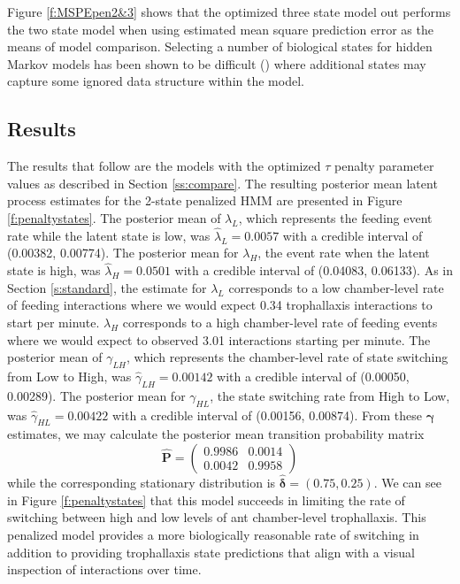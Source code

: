 \documentclass[cmbright,fleqn,referee]{envauth}
\begin{document}
Figure \ref{f:MSPEpen2&3} shows that the optimized three state model out performs the two state model when using estimated mean square prediction error as the means of model comparison. Selecting a number of biological states for hidden Markov models has been shown to be difficult (\cite{Pohle2017}) where additional states may capture some ignored data structure within the model. 
\subsection{Results}
The results that follow are the models with the optimized $\tau$ penalty parameter values as described in Section \ref{ss:compare}. The resulting posterior mean latent process estimates for the 2-state penalized HMM are presented in Figure \ref{f:penaltystates}. The posterior mean of $\lambda_L$, which represents the feeding event rate while the latent state is low, was $\hat{\lambda}_L = 0.0057$ with a credible interval of (0.00382, 0.00774). The posterior mean for $\lambda_H$, the event rate when the latent state is high, was $\hat{\lambda}_H = 0.0501$ with a credible interval of (0.04083, 0.06133). As in Section \ref{s:standard}, the estimate for $\lambda_L$ corresponds to a low chamber-level rate of feeding interactions where we would expect 0.34 trophallaxis interactions to start per minute. $\lambda_H$ corresponds to a high chamber-level rate of feeding events where we would expect to observed 3.01 interactions starting per minute. The posterior mean of $\gamma_{LH}$, which represents the chamber-level rate of state switching from Low to High, was $\hat{\gamma}_{LH} = 0.00142$  with a credible interval of (0.00050, 0.00289). The posterior mean for $\gamma_{HL}$, the state switching rate from High to Low, was $\hat{\gamma}_{HL} =  
0.00422 $ with a credible interval of (0.00156, 0.00874). From these $\bm{\gamma}$ estimates, we may calculate the posterior mean transition probability matrix 
\begin{equation}
\hat{\mathbf{P}} = \begin{pmatrix}
 0.9986 & 0.0014 \\
 0.0042 &   0.9958
\end{pmatrix}
\end{equation}
while the corresponding stationary distribution is $\hat{\bm{\delta}} = (0.75, 0.25)$. 
 We can see in Figure \ref{f:penaltystates} that  this model succeeds in limiting the rate of switching between high and low levels of ant chamber-level trophallaxis. This penalized model provides a more biologically reasonable rate of switching in addition to providing trophallaxis state predictions that align with a visual inspection of interactions over time. 
\end{document}
